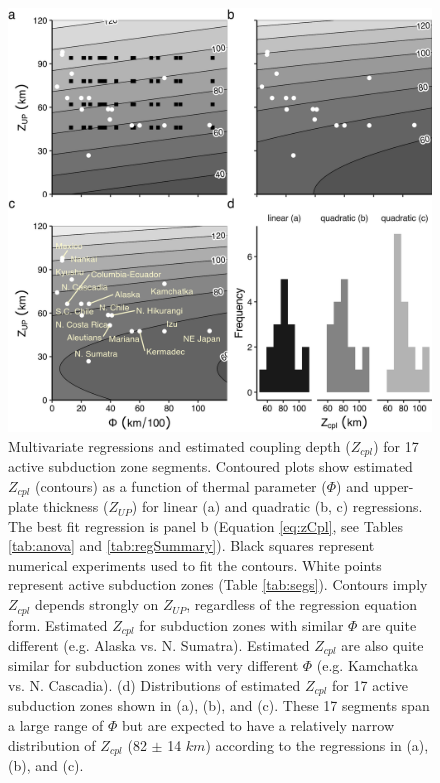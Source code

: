 \begin{figure}[htbp]

{\centering \includegraphics[width=1\linewidth,]{assets/figs/chpt2/fig4} 

}

\caption[Estimated coupling depths for 17 active subduction zone segments]{Multivariate regressions and estimated coupling depth ($Z_{cpl}$) for 17 active subduction zone segments. Contoured plots show estimated $Z_{cpl}$ (contours) as a function of thermal parameter ($\Phi$) and upper-plate thickness ($Z_{UP}$) for linear (a) and quadratic (b, c) regressions. The best fit regression is panel b (Equation \ref{eq:zCpl}, see Tables \ref{tab:anova} and \ref{tab:regSummary}). Black squares represent numerical experiments used to fit the contours. White points represent active subduction zones (Table \ref{tab:segs}). Contours imply $Z_{cpl}$ depends strongly on $Z_{UP}$, regardless of the regression equation form. Estimated $Z_{cpl}$ for subduction zones with similar $\Phi$ are quite different (e.g. Alaska vs. N. Sumatra). Estimated $Z_{cpl}$ are also quite similar for subduction zones with very different $\Phi$ (e.g. Kamchatka vs. N. Cascadia). (d) Distributions of estimated $Z_{cpl}$ for 17 active subduction zones shown in (a), (b), and (c). These 17 segments span a large range of $\Phi$ but are expected to have a relatively narrow distribution of $Z_{cpl}$ (82 $\pm$ 14 $km$) according to the regressions in (a), (b), and (c).}\label{fig:multiv}
\end{figure}

